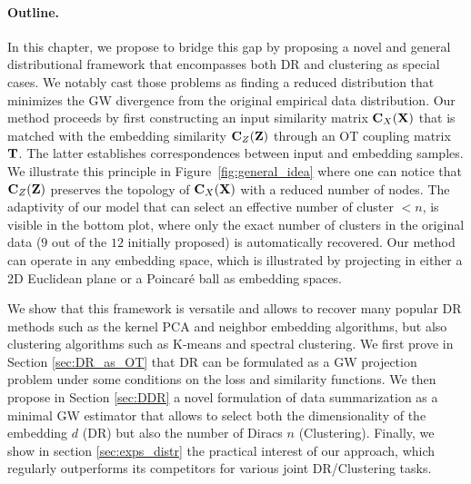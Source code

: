 \paragraph{Outline.} In this chapter, we propose to bridge this gap by
proposing a novel and general distributional framework that encompasses both DR and clustering
as special cases. We notably cast those problems as finding a reduced distribution that minimizes the GW divergence from the original empirical data distribution.
Our method proceeds by first constructing an input similarity matrix
${\mathbf{C}}_X({\mathbf{X}})$ that is matched with the embedding similarity ${\mathbf{C}}_Z({\mathbf{Z}})$ through
an OT coupling matrix ${\mathbf{T}}$. The latter establishes correspondences between
input and embedding samples. We illustrate this principle in
Figure~\ref{fig:general_idea} where one can notice that ${\mathbf{C}}_Z({\mathbf{Z}})$ preserves
the topology of ${\mathbf{C}}_X({\mathbf{X}})$ with a reduced number of nodes. The adaptivity of
our model that can select an effective number of cluster $<n$, is visible in the
bottom plot, where only the exact number of clusters in the original data ($9$ out of the $12$
initially proposed) is automatically recovered. Our method can operate in any embedding space, which is illustrated by
projecting in either a 2D Euclidean plane or a Poincaré ball as embedding
spaces.

We show that this framework is versatile and allows to recover many popular DR
methods such as the kernel PCA and neighbor embedding algorithms, but also clustering 
algorithms such as K-means and spectral clustering. We first prove in Section
\ref{sec:DR_as_OT} that DR can be formulated as a GW projection problem under
some conditions on the loss and similarity functions. We then propose in Section
\ref{sec:DDR} a novel formulation of data summarization as a minimal GW estimator that allows
to select both the dimensionality of the embedding $d$ (DR) but also the number of Diracs
$n$ (Clustering).
Finally, we show in section \ref{sec:exps_distr} the practical interest of our approach, which regularly outperforms its competitors for various joint DR/Clustering tasks.

